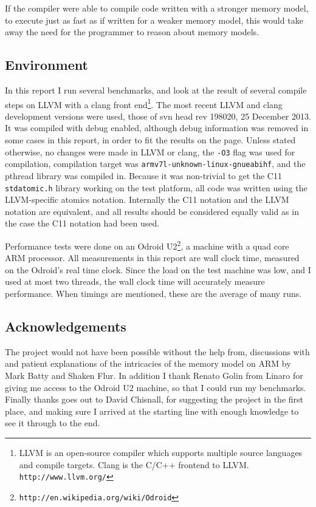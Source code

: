 \documentclass[journal]{IEEEtran}
\begin{document}
If the compiler were able to compile code written with a stronger memory model, to execute just as fast as if written for a weaker memory model, this would take away the need for the programmer to reason about memory models.

\subsection{Environment}

In this report I run several benchmarks, and look at the result of several compile steps on LLVM with a clang front end\footnote{LLVM is an open-source compiler which supports multiple source languages and compile targets. Clang is the C/C++ frontend to LLVM. \texttt{http://www.llvm.org/}}.
The most recent LLVM and clang development versions were used, those of svn head rev 198020, 25 December 2013.
It was compiled with debug enabled, although debug information was removed in some cases in this report, in order to fit the results on the page.
Unless stated otherwise, no changes were made in LLVM or clang, the \texttt{-O3} flag was used for compilation, compilation target was \texttt{armv7l-unknown-linux-gnueabihf}, and the pthread library was compiled in.
Because it was non-trivial to get the C11 \texttt{stdatomic.h} library working on the test platform, all code was written using the LLVM-specific atomics notation.
Internally the C11 notation and the LLVM notation are equivalent, and all results should be considered equally valid as in the case the C11 notation had been used.

Performance tests were done on an Odroid U2\footnote{\texttt{http://en.wikipedia.org/wiki/Odroid}}, a machine with a quad core ARM processor.
All measurements in this report are wall clock time, measured on the Odroid's real time clock.
Since the load on the test machine was low, and I used at most two threads, the wall clock time will accurately measure performance.
When timings are mentioned, these are the average of many runs.

\subsection{Acknowledgements}
The project would not have been possible without the help from, discussions with and patient explanations of the intricacies of the memory model on ARM by Mark Batty and Shaken Flur.
In addition I thank Renato Golin from Linaro for giving me access to the Odroid U2 machine, so that I could run my benchmarks.
Finally thanks goes out to David Chisnall, for suggesting the project in the first place, and making sure I arrived at the starting line with enough knowledge to see it through to the end.
\end{document}
